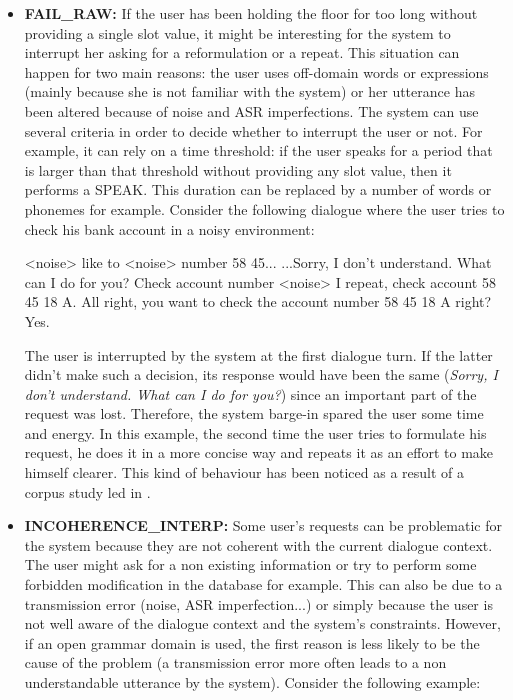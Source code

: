      \begin{itemize}

     \item \textbf{FAIL\_RAW:} If the user has been holding the floor for too long without providing a single slot value, it might be interesting for the system to interrupt her asking for a reformulation or a repeat. This situation can happen for two main reasons: the user uses off-domain words or expressions (mainly because she is not familiar with the system) or her utterance has been altered because of noise and ASR imperfections. The system can use several criteria in order to decide whether to interrupt the user or not. For example, it can rely on a time threshold: if the user speaks for a period that is larger than that threshold without providing any slot value, then it performs a SPEAK. This duration can be replaced by a number of words or phonemes for example. Consider the following dialogue where the user tries to check his bank account in a noisy environment:

          \begin{dialogue}
             <noise> like to <noise> number 58 45...
             ...Sorry, I don't understand. What can I do for you?
             Check account number <noise> I repeat, check account 58 45 18 A.
             All right, you want to check the account number 58 45 18 A right?
             Yes.
          \end{dialogue}

          The user is interrupted by the system at the first dialogue turn. If the latter didn't make such a decision, its response would have been the same (\textit{Sorry, I don't understand. What can I do for you?}) since an important part of the request was lost. Therefore, the system barge-in spared the user some time and energy. In this example, the second time the user tries to formulate his request, he does it in a more concise way and repeats it as an effort to make himself clearer. This kind of behaviour has been noticed as a result of a corpus study led in \cite{Ghigi2014}.

     \item \textbf{INCOHERENCE\_INTERP:} Some user's requests can be problematic for the system because they are not coherent with the current dialogue context. The user might ask for a non existing information or try to perform some forbidden modification in the database for example. This can also be due to a transmission error (noise, ASR imperfection...) or simply because the user is not well aware of the dialogue context and the system's constraints. However, if an open grammar domain is used, the first reason is less likely to be the cause of the problem (a transmission error more often leads to a non understandable utterance by the system). Consider the following example:
		

\end{itemize}
